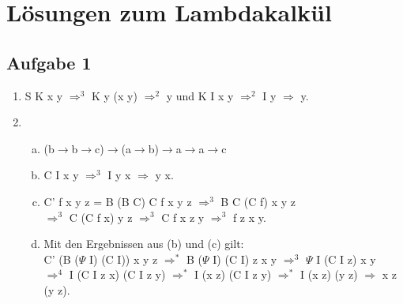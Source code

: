 \documentclass{scrartcl}
\begin{document}
\section*{Lösungen zum Lambdakalkül}
\subsection*{Aufgabe 1}
\begin{enumerate}[1.]
\item S K x y $\Rightarrow^3$ K y (x y) $\Rightarrow^2$ y und K I x y $\Rightarrow^2$ I y $\Rightarrow$ y.
\item
\begin{enumerate}[(a)]
\item (b$\to$b$\to$c)$\to$(a$\to$b)$\to$a$\to$a$\to$c
\item C I x y $\Rightarrow^3$  I y x $\Rightarrow$ y x.
\item C' f x y z = B (B C) C f x y z $\Rightarrow^3$ B C (C f) x y z \\$\Rightarrow^3$ C (C f x) y z $\Rightarrow^3$ C f x z y $\Rightarrow^3$ f z x y.
\item Mit den Ergebnissen aus (b) und (c) gilt:\\
C' (B ($\Psi$ I) (C I)) x y z $\Rightarrow^*$ B ($\Psi$ I) (C I) z x y $\Rightarrow^3$
$\Psi$ I (C I z) x y\\ $\Rightarrow^4$ I (C I z x) (C I z y) $\Rightarrow^*$ I (x z) (C I z y) $\Rightarrow^*$ I (x z) (y z) $\Rightarrow$ x z (y z).
\end{enumerate}
\end{enumerate}
\end{document}
